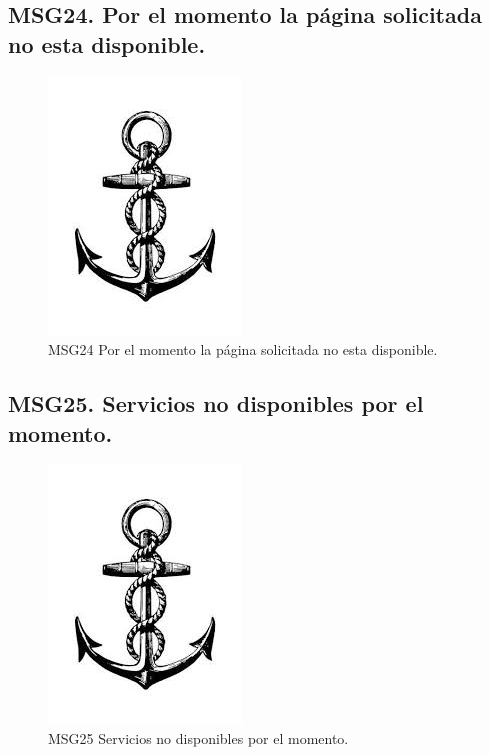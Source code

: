 \subsection{MSG24. Por el momento la página solicitada no esta disponible.}
    \begin{figure}[htbp]
        \begin{center}
            \includegraphics[width=.4\textwidth]{images/MSG/ancla}
            \caption{MSG24 Por el momento la página solicitada no esta disponible.}
            \label{fig:MSG24}
        \end{center}
    \end{figure}

\subsection{MSG25. Servicios no disponibles por el momento.}
    \begin{figure}[htbp]
        \begin{center}
            \includegraphics[width=.4\textwidth]{images/MSG/ancla}
            \caption{MSG25 Servicios no disponibles por el momento.}
            \label{fig:MSG25}
        \end{center}
    \end{figure}

